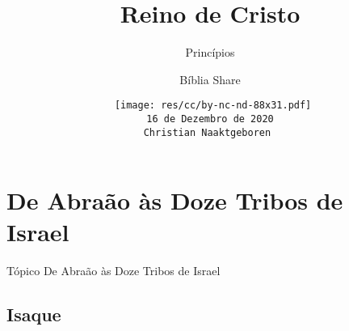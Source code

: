 \documentclass[12pt,aspectratio=169]{beamer}
\title[Reino de Cristo -- Princípios]{Reino de Cristo}
\subtitle{Princípios}
\author{Bíblia Share}
\date[{\tiny\tt 16 de Dezembro de 2020}]{{\scriptsize\tt%
    \texttt{[image: res/cc/by-nc-nd-88x31.pdf]}\\[\smallskipamount]
    16 de Dezembro de 2020\\
    Christian Naaktgeboren
}}
\begin{document}
\begin{frame}
    \titlepage
\end{frame}
\section{De Abraão às Doze Tribos de Israel}

    \begin{frame}
        \par\noindent\hspace*{0.05\linewidth}%
        \begin{minipage}{0.9\linewidth}%
            \large%
            \begin{alertblock}{Tópico}
                De Abraão às Doze Tribos de Israel
            \end{alertblock}
        \end{minipage}%
    \end{frame}

    \subsection{Isaque}
\end{document}
